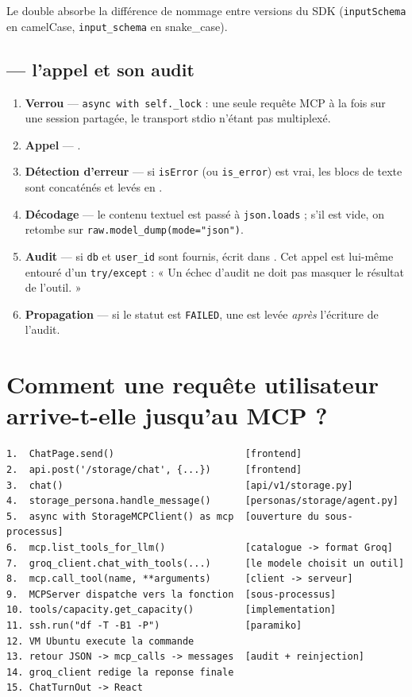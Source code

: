 \noindent
Le double  absorbe la différence de nommage entre versions du SDK
(\texttt{inputSchema} en camelCase, \texttt{input\_schema} en snake\_case).

\subsection*{ --- l'appel et son audit}

\begin{enumerate}
  \item \textbf{Verrou} --- \texttt{async with self.\_lock} : une seule requête
  MCP à la fois sur une session partagée, le transport stdio n'étant pas
  multiplexé.
  \item \textbf{Appel} --- .
  \item \textbf{Détection d'erreur} --- si \texttt{isError} (ou
  \texttt{is\_error}) est vrai, les blocs de texte sont concaténés et levés en
  .
  \item \textbf{Décodage} --- le contenu textuel est passé à
  \texttt{json.loads} ; s'il est vide, on retombe sur
  \texttt{raw.model\_dump(mode="json")}.
  \item \textbf{Audit} --- si \texttt{db} et \texttt{user\_id} sont fournis,
   écrit dans . Cet appel est lui-même
  entouré d'un \texttt{try/except} : « Un échec d'audit ne doit pas masquer le
  résultat de l'outil. »
  \item \textbf{Propagation} --- si le statut est \texttt{FAILED}, une
   est levée \emph{après} l'écriture de l'audit.
\end{enumerate}

\section{Comment une requête utilisateur arrive-t-elle jusqu'au MCP ?}

\begin{lstlisting}[caption={Trajet complet, fonction par fonction}]
1.  ChatPage.send()                       [frontend]
2.  api.post('/storage/chat', {...})      [frontend]
3.  chat()                                [api/v1/storage.py]
4.  storage_persona.handle_message()      [personas/storage/agent.py]
5.  async with StorageMCPClient() as mcp  [ouverture du sous-processus]
6.  mcp.list_tools_for_llm()              [catalogue -> format Groq]
7.  groq_client.chat_with_tools(...)      [le modele choisit un outil]
8.  mcp.call_tool(name, **arguments)      [client -> serveur]
9.  MCPServer dispatche vers la fonction  [sous-processus]
10. tools/capacity.get_capacity()         [implementation]
11. ssh.run("df -T -B1 -P")               [paramiko]
12. VM Ubuntu execute la commande
13. retour JSON -> mcp_calls -> messages  [audit + reinjection]
14. groq_client redige la reponse finale
15. ChatTurnOut -> React
\end{lstlisting}

